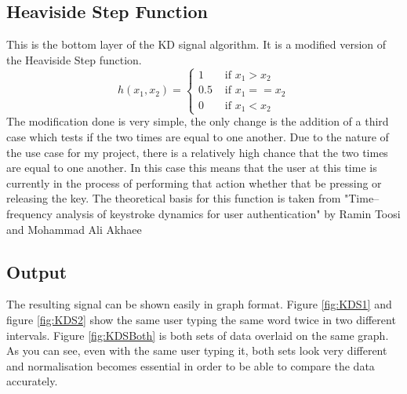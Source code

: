 \documentclass[10pt,a4paper]{report}
\begin{document}
\subsection{Heaviside Step Function}
This is the bottom layer of the KD signal algorithm. It is a modified version of the Heaviside Step function.
\begin{equation}
	h(x_1, x_2) = \begin{cases}
	1 & \text{ if } x_1 > x_2 \\
	0.5 & \text{ if } x_1 == x_2 \\
	0 & \text{ if } x_1 < x_2
\end{cases}
\end{equation}
The modification done is very simple, the only change is the addition of a third case which tests if the two times are equal to one another. Due to the nature of the use case for my project, there is a relatively high chance that the two times are equal to one another. In this case this means that the user at this time is currently in the process of performing that action whether that be pressing or releasing the key. The theoretical basis for this function is taken from "Time–frequency analysis of keystroke dynamics for user authentication" by Ramin Toosi and Mohammad Ali Akhaee\cite{ToosiRamin2021Taok}

\subsection{Output}
The resulting signal can be shown easily in graph format. Figure \ref{fig:KDS1} and figure \ref{fig:KDS2} show the same user typing the same word twice in two different intervals. Figure \ref{fig:KDSBoth} is both sets of data overlaid on the same graph. As you can see, even with the same user typing it, both sets look very different and normalisation becomes essential in order to be able to compare the data accurately. 
\end{document}
